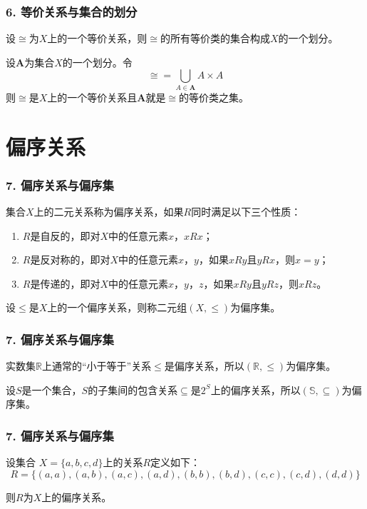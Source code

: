 \documentclass{beamer}
\begin{document}
\begin{CJK*}{UTF8}{gbsn}
\begin{frame}
  \frametitle{6. 等价关系与集合的划分}
  \begin{Thm}
    设$\cong$为$X$上的一个等价关系，则$\cong$的所有等价类的集合构成$X$的一个划分。
  \end{Thm}
  \pause
  \begin{Thm}
    设$\mathbf{A}$为集合$X$的一个划分。令
    \begin{equation*}
      \cong = \bigcup_{A\in \mathbf{A}}A\times A
    \end{equation*}
    则$\cong$是$X$上的一个等价关系且$\mathbf{A}$就是$\cong$的等价类之集。
  \end{Thm}
\end{frame}
\section{偏序关系}
\begin{frame}
  \frametitle{7. 偏序关系与偏序集}
  \begin{Def}
    集合$X$上的二元关系称为\alert{偏序关系}，如果$R$同时满足以下三个性质：
    \begin{enumerate}[(1)]
    \item $R$是自反的，即对$X$中的任意元素$x$，$xRx$；
    \item $R$是反对称的，即对$X$中的任意元素$x$，$y$，如果$xRy$且$yRx$，则$x=y$；
    \item $R$是传递的，即对$X$中的任意元素$x$，$y$，$z$，如果$xRy$且$yRz$，则$xRz$。
    \end{enumerate}
  \end{Def}\pause
    \begin{Def}
    设$\leq$是$X$上的一个偏序关系，则称二元组$(X,\leq)$为\alert{偏序集}。
  \end{Def}
\end{frame}

\begin{frame}
  \frametitle{7. 偏序关系与偏序集}
  \begin{Ex}
    实数集$\mathbb{R}$上通常的“小于等于”关系$\leq$是偏序关系，所以$(\mathbb{R},\leq)$为偏序集。
  \end{Ex}
  \begin{Ex}
    设$S$是一个集合，$S$的子集间的包含关系$\subseteq$是$2^S$上的偏序关系，所以$(\mathbb{S},\subseteq)$为偏序集。
  \end{Ex}
\end{frame}

\begin{frame}
  \frametitle{7. 偏序关系与偏序集}
  \begin{Ex}
    设集合
    $X=\{a,b,c,d\}$上的关系$R$定义如下：
    \begin{equation*}
      R=\{(a,a),(a,b),(a,c),(a,d),(b,b),(b,d),(c,c),(c,d),(d,d)\}
    \end{equation*}
  \end{Ex}
  则$R$为$X$上的偏序关系。
\end{frame}


\end{CJK*}
\end{document}
